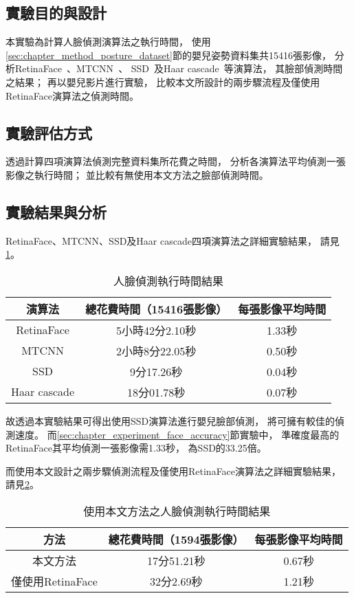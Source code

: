 \documentclass[class=NCU_thesis, crop=false]{standalone}
\begin{document}
\subsection{實驗目的與設計}
本實驗為計算人臉偵測演算法之執行時間，
使用\ref{sec:chapter_method_posture_dataset}節的嬰兒姿勢資料集共15416張影像，
分析RetinaFace~\cite{deng_retinaface_2020}、MTCNN~\cite{zhang_joint_2016}、
SSD~\cite{ye_face_2021}及Haar cascade~\cite{goyal_face_2017}等演算法，
其臉部偵測時間之結果；
再以嬰兒影片進行實驗，
比較本文所設計的兩步驟流程及僅使用RetinaFace演算法之偵測時間。

\subsection{實驗評估方式}
透過計算四項演算法偵測完整資料集所花費之時間，
分析各演算法平均偵測一張影像之執行時間；
並比較有無使用本文方法之臉部偵測時間。

\subsection{實驗結果與分析}
RetinaFace、MTCNN、SSD及Haar cascade四項演算法之詳細實驗結果，
請見\cref{table:table-face-detection-time}。
\begin{table}[h]
    \centering
    \caption{人臉偵測執行時間結果}
    \label{table:table-face-detection-time}
    \begin{tabular}{ccc}
    \hline
    演算法 & 總花費時間（15416張影像） & 每張影像平均時間 \\
    \hline
    RetinaFace & 5小時42分2.10秒 & 1.33秒 \\
    MTCNN & 2小時8分22.05秒 & 0.50秒 \\
    SSD & 9分17.26秒 & 0.04秒 \\
    Haar cascade & 18分01.78秒 & 0.07秒 \\
    \hline
    \end{tabular}
\end{table}

故透過本實驗結果可得出使用SSD演算法進行嬰兒臉部偵測，
將可擁有較佳的偵測速度。
而\ref{sec:chapter_experiment_face_accuracy}節實驗中，
準確度最高的RetinaFace其平均偵測一張影像需1.33秒，
為SSD的33.25倍。

而使用本文設計之兩步驟偵測流程及僅使用RetinaFace演算法之詳細實驗結果，
請見\cref{table:table-face-detection-time-2}。
\begin{table}[h]
    \centering
    \caption{使用本文方法之人臉偵測執行時間結果}
    \label{table:table-face-detection-time-2}
    \begin{tabular}{ccc}
    \hline
    方法 & 總花費時間（1594張影像） & 每張影像平均時間 \\
    \hline
    本文方法 & 17分51.21秒 & 0.67秒 \\
    僅使用RetinaFace & 32分2.69秒 & 1.21秒 \\
    \hline
    \end{tabular}
\end{table}
\end{document}
